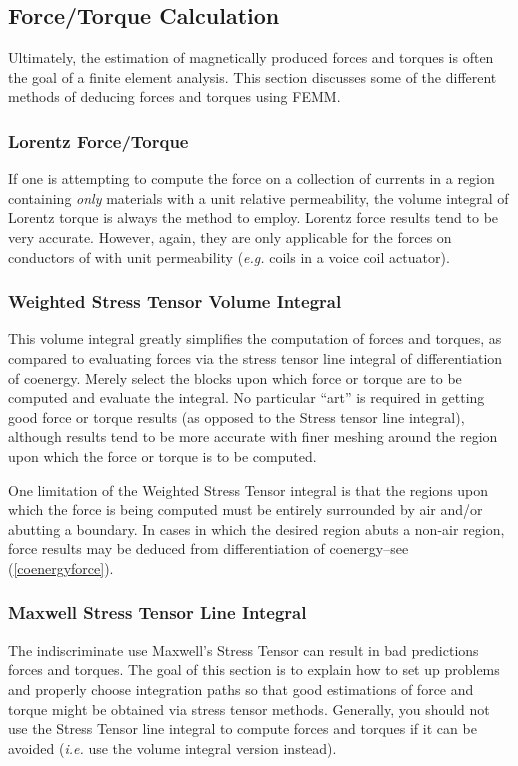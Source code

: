 \documentclass[12pt]{report}
\begin{document}
\subsection{Force/Torque Calculation} \label{maxforce}

Ultimately, the estimation of magnetically produced forces and
torques is often the goal of a finite element analysis.  This
section discusses some of the different methods of deducing forces
and torques using FEMM.

\subsubsection{Lorentz Force/Torque}
If one is attempting to compute the force on a collection of
currents in a region containing {\em only} materials with a unit
relative permeability, the volume integral of Lorentz torque is
always the method to employ.  Lorentz force results tend to be
very accurate.  However, again, they are only applicable for the
forces on conductors of with unit permeability ({\em e.g.} coils
in a voice coil actuator).

\subsubsection{Weighted Stress Tensor Volume Integral}
This volume integral greatly simplifies the computation of forces
and torques, as compared to evaluating forces via the stress tensor
line integral of differentiation of coenergy. Merely select the
blocks upon which force or torque are to be computed and evaluate
the integral. No particular ``art'' is required in getting good
force or torque results (as opposed to the Stress tensor line
integral), although results tend to be more accurate with finer
meshing around the region upon which the force or torque is to be
computed.

One limitation of the Weighted Stress Tensor integral is that the
regions upon which the force is being computed must be entirely
surrounded by air and/or abutting a boundary. In cases in which the
desired region abuts a non-air region, force results may be deduced
from differentiation of coenergy--see (\ref{coenergyforce}).

\subsubsection{Maxwell Stress Tensor Line Integral}
The indiscriminate use Maxwell's Stress Tensor can result in bad
predictions forces and  torques.  The goal of this section is to
explain how to set up problems and properly choose integration
paths so that good estimations of force and torque might be
obtained via stress tensor methods.  Generally, you should not
use the Stress Tensor line integral to compute forces and torques
if it can be avoided ({\em i.e.} use the volume integral version instead).
\end{document}
